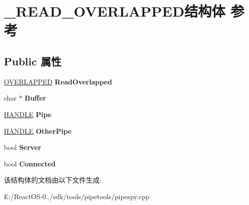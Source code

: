\hypertarget{struct___r_e_a_d___o_v_e_r_l_a_p_p_e_d}{}\section{\+\_\+\+R\+E\+A\+D\+\_\+\+O\+V\+E\+R\+L\+A\+P\+P\+E\+D结构体 参考}
\label{struct___r_e_a_d___o_v_e_r_l_a_p_p_e_d}
\subsection*{Public 属性}
\begin{DoxyCompactItemize}
\item 
\mbox{\label{struct___r_e_a_d___o_v_e_r_l_a_p_p_e_d_a93f1d201115ce877496732fe29b6702d}} 
\hyperlink{struct___o_v_e_r_l_a_p_p_e_d}{O\+V\+E\+R\+L\+A\+P\+P\+ED} {\bfseries Read\+Overlapped}
\item 
\mbox{\label{struct___r_e_a_d___o_v_e_r_l_a_p_p_e_d_a9f4eceed38d37fff00ec5c798851f800}} 
char $\ast$ {\bfseries Buffer}
\item 
\mbox{\label{struct___r_e_a_d___o_v_e_r_l_a_p_p_e_d_a7c0592a4bc09393b5677d236852e8af9}} 
\hyperlink{interfacevoid}{H\+A\+N\+D\+LE} {\bfseries Pipe}
\item 
\mbox{\label{struct___r_e_a_d___o_v_e_r_l_a_p_p_e_d_a613e882e67227ee266cd26df6bf0efa6}} 
\hyperlink{interfacevoid}{H\+A\+N\+D\+LE} {\bfseries Other\+Pipe}
\item 
\mbox{\label{struct___r_e_a_d___o_v_e_r_l_a_p_p_e_d_a84386dc44203c6d84296386b403cee6b}} 
bool {\bfseries Server}
\item 
\mbox{\label{struct___r_e_a_d___o_v_e_r_l_a_p_p_e_d_aeafc1e7a48cfb2ae057ce44c8d9100c9}} 
bool {\bfseries Connected}
\end{DoxyCompactItemize}


该结构体的文档由以下文件生成\+:\begin{DoxyCompactItemize}
\item 
E\+:/\+React\+O\+S-\/0../sdk/tools/pipetools/pipespy.\+cpp\end{DoxyCompactItemize}
